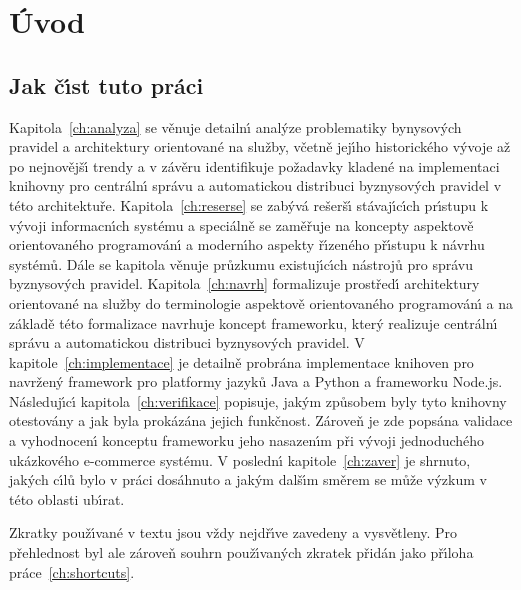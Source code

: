 

\chapter{Úvod}\label{ch:uvod}


\section{Jak č\'{\i}st tuto práci}

Kapitola~\ref{ch:analyza} se věnuje detailn\'{\i} anal\'yze problematiky bynysov\'ych pravidel a
architektury orientované na služby, včetně jej\'{\i}ho historického v\'yvoje až po nejnovějš\'{\i} trendy
a v závěru identifikuje požadavky kladené na implementaci knihovny pro centráln\'{\i} správu a
automatickou distribuci byznysov\'ych pravidel v této architektuře. Kapitola~\ref{ch:reserse}
se zab\'yvá rešerš\'{\i} stávaj\'{\i}c\'{\i}ch pr\'{\i}stupu k v\'yvoji informacn\'{\i}ch systému a speciálně se zaměřuje
na koncepty aspektově orientovaného programován\'{\i} a modern\'{\i}ho aspekty ř\'{\i}zeného př\'{\i}stupu k návrhu
systémů. Dále se kapitola věnuje průzkumu existuj\'{\i}c\'{\i}ch nástrojů pro správu byznysov\'ych pravidel.
Kapitola~\ref{ch:navrh} formalizuje prostřed\'{\i} architektury orientované na služby do terminologie
aspektově orientovaného programován\'{\i} a na základě této formalizace navrhuje koncept frameworku,
kter\'y realizuje centráln\'{\i} správu a automatickou distribuci byznysov\'ych pravidel.
V kapitole~\ref{ch:implementace} je detailně probrána implementace knihoven pro navržen\'y framework
pro platformy jazyků Java a Python a frameworku Node.js. Následuj\'{\i}c\'{\i} kapitola~\ref{ch:verifikace}
popisuje, jak\'ym způsobem byly tyto knihovny otestovány a jak byla prokázána jejich funkčnost. Zároveň
je zde popsána validace a vyhodnocen\'{\i} konceptu frameworku jeho nasazen\'{\i}m při v\'yvoji
jednoduchého ukázkového e-commerce systému. V posledn\'{\i} kapitole~\ref{ch:zaver} je shrnuto, jak\'ych
c\'{\i}lů bylo v práci dosáhnuto a jak\'ym dalš\'{\i}m směrem se může v\'yzkum v této oblasti ub\'{\i}rat.

Zkratky použ\'{\i}vané v textu jsou vždy nejdř\'{\i}ve zavedeny a vysvětleny. Pro přehlednost byl ale zároveň
souhrn použ\'{\i}van\'ych zkratek přidán jako př\'{\i}loha práce~\ref{ch:shortcuts}.
